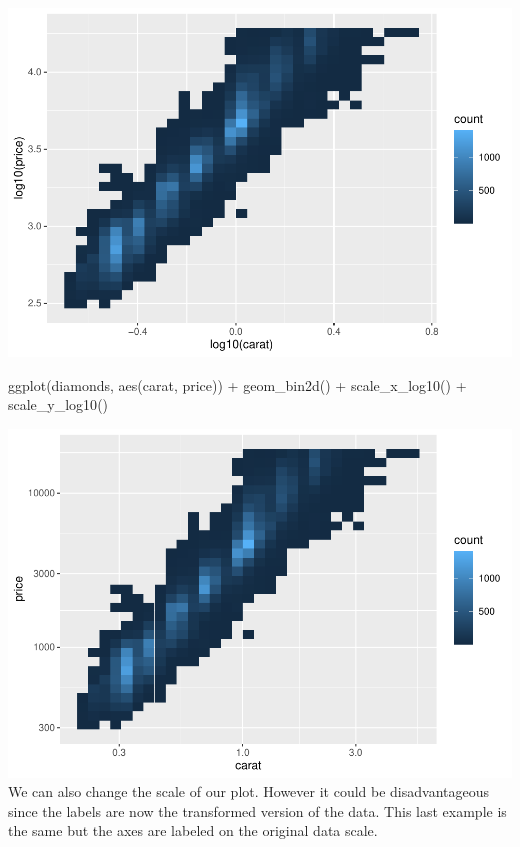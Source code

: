 \documentclass[
]{article}
\newenvironment{Shaded}{\begin{snugshade}}{\end{snugshade}}
\newcommand{\FunctionTok}[1]{\textcolor[rgb]{0.00,0.00,0.00}{#1}}
\newcommand{\NormalTok}[1]{#1}
\newcommand{\SpecialCharTok}[1]{\textcolor[rgb]{0.00,0.00,0.00}{#1}}
\begin{document}
\includegraphics{Journal_files/figure-latex/unnamed-chunk-58-2.pdf}

\begin{Shaded}
\begin{Highlighting}[]
\FunctionTok{ggplot}\NormalTok{(diamonds, }\FunctionTok{aes}\NormalTok{(carat, price)) }\SpecialCharTok{+}
  \FunctionTok{geom\_bin2d}\NormalTok{() }\SpecialCharTok{+} 
  \FunctionTok{scale\_x\_log10}\NormalTok{() }\SpecialCharTok{+} 
  \FunctionTok{scale\_y\_log10}\NormalTok{()}
\end{Highlighting}
\end{Shaded}

\includegraphics{Journal_files/figure-latex/unnamed-chunk-58-3.pdf} We
can also change the scale of our plot. However it could be
disadvantageous since the labels are now the transformed version of the
data. This last example is the same but the axes are labeled on the
original data scale.
\end{document}
